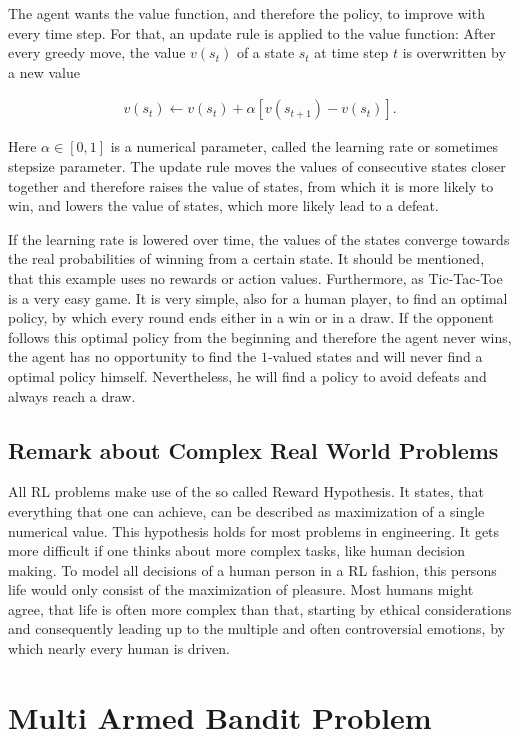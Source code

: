 \documentclass[paper=a4, fontsize=11pt]{scrartcl} %
\numberwithin{equation}{section} %
\numberwithin{figure}{section} %
\numberwithin{table}{section} %
\begin{document}
	The agent wants the value function, and therefore the policy, to improve with every time step. For that, an update rule is applied to the value function: After every greedy move, the value $v(s_t)$ of a state $s_t$ at time step $t$  is overwritten by a new value 

\begin{align}
v(s_t) \leftarrow v(s_t) + \alpha[v(s_{t+1}) - v(s_{t})].
\end{align}

	Here $\alpha \in [0,1]$ is a numerical parameter, called the learning rate or sometimes stepsize parameter. The update rule moves the values of consecutive states closer together and therefore raises the value of states, from which it is more likely to win, and lowers the value of states, which more likely lead to a defeat. 

	If the learning rate is lowered over time, the values of the states converge towards the real probabilities of winning from a certain state. It should be mentioned, that this example uses no rewards or action values. Furthermore, as Tic-Tac-Toe is a very easy game. It is very simple, also for a human player, to find an optimal policy, by which every round ends either in a win or in a draw. If the opponent follows this optimal policy from the beginning and therefore the agent never wins, the agent has no opportunity to find the $1$-valued states and will never find a optimal policy himself. Nevertheless, he will find a policy to avoid defeats and always reach a draw. 

\subsection{Remark about Complex Real World Problems}

	All RL problems make use of the so called Reward Hypothesis. It states, that everything that one can achieve, can be described as maximization of a single numerical value. This hypothesis holds for most problems in engineering. It gets more difficult if one thinks about more complex tasks, like human decision making. To model all decisions of a human person in a RL fashion, this persons life would only consist of the maximization of pleasure. Most humans might agree, that life is often more complex than that, starting by ethical considerations and consequently leading up to the multiple and often controversial emotions, by which nearly every human is driven. 

\section{Multi Armed Bandit Problem}
\end{document}
